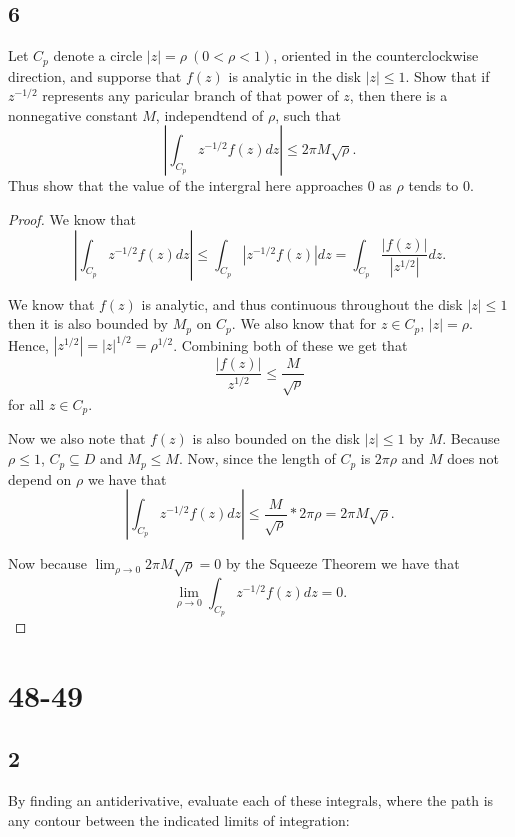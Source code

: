 \documentclass{article}
\begin{document}
\subsection*{6} %
Let $C_p$ denote a circle $|z| = \rho \ (0 < \rho < 1)$, oriented in the counterclockwise
direction, and supporse that $f(z)$ is analytic in the disk $|z| \leq 1$. Show that
if $z^{-1/2}$ represents any paricular branch of that power of $z$, then there is a
nonnegative constant $M$, independtend of $\rho$, such that
$$\left | \int_{C_p} z^{-1/2}f(z) dz \right | \leq 2\pi M \sqrt{\rho}.$$
Thus show that the value of the intergral here approaches 0 as $\rho$ tends to $0$.

\begin{proof}
    We know that
    $$\left | \int_{C_p} z^{-1/2}f(z) dz \right | \leq \int_{C_p} |z^{-1/2}f(z) | dz
        = \int_{C_p} \frac{|f(z)|}{|z^{1/2}|}dz.$$

    We know that $f(z)$ is analytic, and thus continuous throughout the disk $|z| \leq 1$
    then it is also bounded by $M_p$ on $C_p$. We also know that for
    $z \in C_p$, $|z| = \rho$. Hence,
    ${|z^{1/2}| = |z|^{1/2} = \rho^{1/2}}$. Combining both of these we get that
    $$\frac{|f(z)|}{z^{1/2}} \leq \frac{M}{\sqrt{\rho}}$$ for all $z \in C_p$.

    Now we also note that $f(z)$ is also bounded on the disk $|z| \leq 1$ by $M$.
    Because $\rho \leq 1$, $C_p \subseteq D$ and $M_p \leq M$. Now, since the
    length of $C_p$ is $2\pi \rho$ and $M$ does not depend on $\rho$ we have that
    $$\left | \int_{C_p} z^{-1/2}f(z) dz \right | \leq \frac{M}{\sqrt{\rho}}*2\pi\rho
        = 2\pi M \sqrt{\rho}.$$

    Now because $\lim_{\rho \rightarrow 0} 2\pi M \sqrt{\rho} = 0$ by the Squeeze
    Theorem we have that
    $$\lim_{\rho \rightarrow 0} \int_{C_p} z^{-1/2}f(z) dz = 0.$$


\end{proof}

\section*{48-49}
\subsection*{2} %
By finding an antiderivative, evaluate each of these integrals, where
the path is any contour between the indicated limits of integration:
\end{document}
